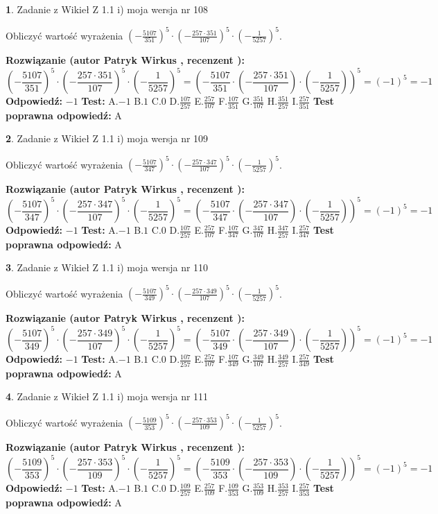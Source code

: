 \documentclass[12pt, a4paper]{article}
\theoremstyle{definition} %
\newtheorem{zad}{}
\newcommand{\zadStart}[1]{\begin{zad}#1\newline}
\newcommand{\zadStop}{\end{zad}}
\newcommand{\rozwStart}[2]{\noindent \textbf{Rozwiązanie (autor #1 , recenzent #2): }\newline}
\newcommand{\rozwStop}{\newline}
\newcommand{\odpStart}{\noindent \textbf{Odpowiedź:}\newline}
\newcommand{\odpStop}{\newline}
\newcommand{\testStart}{\noindent \textbf{Test:}\newline}
\newcommand{\testStop}{\newline}
\newcommand{\kluczStart}{\noindent \textbf{Test poprawna odpowiedź:}\newline}
\newcommand{\kluczStop}{\newline}
\begin{document}
\zadStart{Zadanie z Wikieł Z 1.1 i) moja wersja nr 108}

Obliczyć wartość wyrażenia $(-\frac{5107}{351})^{5} \cdot (-\frac{257 \cdot 351}{107})^{5} \cdot (-\frac{1}{5257})^{5}$.
\zadStop
\rozwStart{Patryk Wirkus}{}
$$(-\frac{5107}{351})^{5} \cdot (-\frac{257 \cdot 351}{107})^{5} \cdot (-\frac{1}{5257})^{5} = (-\frac{5107}{351} \cdot (-\frac{257 \cdot 351}{107}) \cdot (-\frac{1}{5257}))^{5} = (-1)^{5} = -1$$
\rozwStop
\odpStart
$-1$
\odpStop
\testStart
A.$-1$ B.$1$ C.$0$ D.$\frac{107}{257}$ E.$\frac{257}{107}$
F.$\frac{107}{351}$ G.$\frac{351}{107}$
H.$\frac{351}{257}$
I.$\frac{257}{351}$
\testStop
\kluczStart
A
\kluczStop



\zadStart{Zadanie z Wikieł Z 1.1 i) moja wersja nr 109}

Obliczyć wartość wyrażenia $(-\frac{5107}{347})^{5} \cdot (-\frac{257 \cdot 347}{107})^{5} \cdot (-\frac{1}{5257})^{5}$.
\zadStop
\rozwStart{Patryk Wirkus}{}
$$(-\frac{5107}{347})^{5} \cdot (-\frac{257 \cdot 347}{107})^{5} \cdot (-\frac{1}{5257})^{5} = (-\frac{5107}{347} \cdot (-\frac{257 \cdot 347}{107}) \cdot (-\frac{1}{5257}))^{5} = (-1)^{5} = -1$$
\rozwStop
\odpStart
$-1$
\odpStop
\testStart
A.$-1$ B.$1$ C.$0$ D.$\frac{107}{257}$ E.$\frac{257}{107}$
F.$\frac{107}{347}$ G.$\frac{347}{107}$
H.$\frac{347}{257}$
I.$\frac{257}{347}$
\testStop
\kluczStart
A
\kluczStop



\zadStart{Zadanie z Wikieł Z 1.1 i) moja wersja nr 110}

Obliczyć wartość wyrażenia $(-\frac{5107}{349})^{5} \cdot (-\frac{257 \cdot 349}{107})^{5} \cdot (-\frac{1}{5257})^{5}$.
\zadStop
\rozwStart{Patryk Wirkus}{}
$$(-\frac{5107}{349})^{5} \cdot (-\frac{257 \cdot 349}{107})^{5} \cdot (-\frac{1}{5257})^{5} = (-\frac{5107}{349} \cdot (-\frac{257 \cdot 349}{107}) \cdot (-\frac{1}{5257}))^{5} = (-1)^{5} = -1$$
\rozwStop
\odpStart
$-1$
\odpStop
\testStart
A.$-1$ B.$1$ C.$0$ D.$\frac{107}{257}$ E.$\frac{257}{107}$
F.$\frac{107}{349}$ G.$\frac{349}{107}$
H.$\frac{349}{257}$
I.$\frac{257}{349}$
\testStop
\kluczStart
A
\kluczStop



\zadStart{Zadanie z Wikieł Z 1.1 i) moja wersja nr 111}

Obliczyć wartość wyrażenia $(-\frac{5109}{353})^{5} \cdot (-\frac{257 \cdot 353}{109})^{5} \cdot (-\frac{1}{5257})^{5}$.
\zadStop
\rozwStart{Patryk Wirkus}{}
$$(-\frac{5109}{353})^{5} \cdot (-\frac{257 \cdot 353}{109})^{5} \cdot (-\frac{1}{5257})^{5} = (-\frac{5109}{353} \cdot (-\frac{257 \cdot 353}{109}) \cdot (-\frac{1}{5257}))^{5} = (-1)^{5} = -1$$
\rozwStop
\odpStart
$-1$
\odpStop
\testStart
A.$-1$ B.$1$ C.$0$ D.$\frac{109}{257}$ E.$\frac{257}{109}$
F.$\frac{109}{353}$ G.$\frac{353}{109}$
H.$\frac{353}{257}$
I.$\frac{257}{353}$
\testStop
\kluczStart
A
\kluczStop
\end{document}
